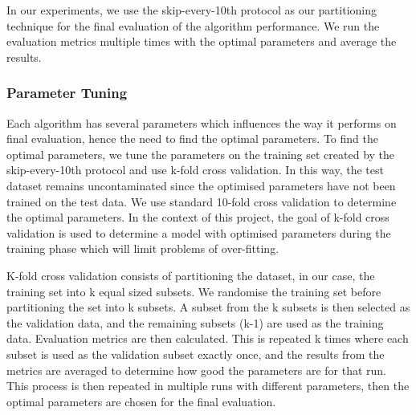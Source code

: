 In our experiments, we use the skip-every-10th protocol as our partitioning technique for the final evaluation of the algorithm performance. We run the evaluation metrics multiple times with the optimal parameters and average the results. 

\subsubsection{Parameter Tuning}

Each algorithm has several parameters which influences the way it performs on final evaluation, hence the need to find the optimal parameters. To find the optimal parameters, we tune the parameters on the training set created by the skip-every-10th protocol and use k-fold cross validation. In this way, the test dataset remains uncontaminated since the optimised parameters have not been trained on the test data. 
We use standard 10-fold cross validation to determine the optimal parameters. In the context of this project, the goal of k-fold cross validation is used to determine a model with optimised parameters during the training phase which will limit problems of over-fitting. 

K-fold cross validation consists of partitioning the dataset, in our case, the training set into k equal sized subsets. We randomise the training set before partitioning the set into k subsets. A subset from the k subsets is then selected as the validation data, and the remaining subsets (k-1) are used as the training data. Evaluation metrics are then calculated. This is repeated k times where each subset is used as the validation subset exactly once, and the results from the metrics are averaged to determine how good the parameters are for that run. This process is then repeated in multiple runs with different parameters, then the optimal parameters are chosen for the final evaluation. 

\subsubsection{}
